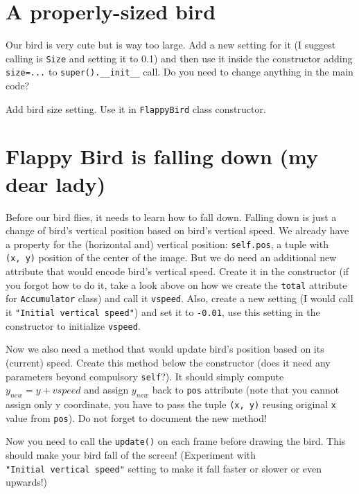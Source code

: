 \documentclass[
]{book}
\begin{document}
\hypertarget{a-properly-sized-bird}{%
\section{A properly-sized bird}\label{a-properly-sized-bird}}

Our bird is very cute but is way too large. Add a new setting for it (I suggest calling is \texttt{Size} and setting it to 0.1) and then use it inside the constructor adding \texttt{size=...} to \texttt{super().\_\_init\_\_} call. Do you need to change anything in the main code?

Add bird size setting.
Use it in \texttt{FlappyBird} class constructor.

\hypertarget{flappy-bird-is-falling-down-my-dear-lady}{%
\section{Flappy Bird is falling down (my dear lady)}\label{flappy-bird-is-falling-down-my-dear-lady}}

Before our bird flies, it needs to learn how to fall down. Falling down is just a change of bird's vertical position based on bird's vertical speed. We already have a property for the (horizontal and) vertical position: \texttt{self.pos}, a tuple with \texttt{(x,\ y)} position of the center of the image. But we do need an additional new attribute that would encode bird's vertical speed. Create it in the constructor (if you forgot how to do it, take a look above on how we create the \texttt{total} attribute for \texttt{Accumulator} class) and call it \texttt{vspeed}. Also, create a new setting (I would call it \texttt{"Initial\ vertical\ speed"}) and set it to \texttt{-0.01}, use this setting in the constructor to initialize \texttt{vspeed}.

Now we also need a method that would update bird's position based on its (current) speed. Create this method below the constructor (does it need any parameters beyond compulsory \texttt{self}?). It should simply compute \(y_{new} = y + vspeed\) and assign \(y_{new}\) back to \texttt{pos} attribute (note that you cannot assign only y coordinate, you have to pass the tuple \texttt{(x,\ y)} reusing original \texttt{x} value from \texttt{pos}). Do not forget to document the new method!

Now you need to call the \texttt{update()} on each frame before drawing the bird. This should make your bird fall of the screen! (Experiment with \texttt{"Initial\ vertical\ speed"} setting to make it fall faster or slower or even upwards!)
\end{document}
